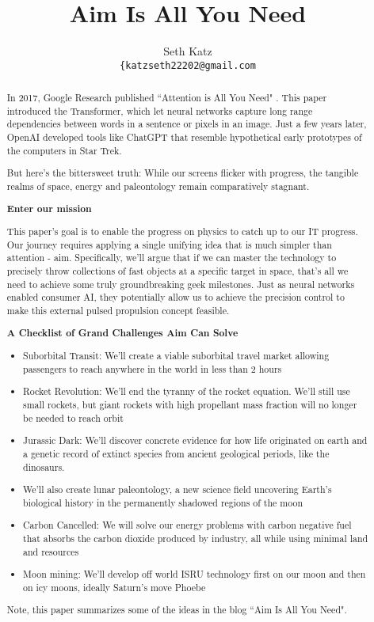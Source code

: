 \documentclass{article}
\title{Aim Is All You Need}
\author{
  Seth Katz \\
  \texttt{\{katzseth22202@gmail.com} \\
}
\begin{document}
\maketitle

\begin{abstract}\label{sec:abstract}
 In 2017, Google Research published ``Attention is All You Need" \cite{vaswani2023attentionneed}.  This paper introduced the Transformer, which let neural networks capture long range dependencies between words in a sentence or pixels in an image.   Just a few years later, OpenAI developed tools like ChatGPT that resemble hypothetical early prototypes of the computers in Star Trek.

But here's the bittersweet truth:  While our screens flicker with progress, the tangible realms of space, energy and paleontology remain comparatively stagnant.

\textbf{Enter our mission}

This paper's goal is to enable the progress on physics to catch up to our IT progress.  Our journey requires applying a single unifying idea that is much simpler than attention - aim.   Specifically, we'll argue that if we can master the technology to precisely throw collections of fast objects at a specific target in space, that's all we need to achieve some truly groundbreaking geek milestones.   Just as neural networks enabled consumer AI, they potentially allow us to achieve the precision control to make this external pulsed propulsion concept feasible.

\textbf{A Checklist of Grand Challenges Aim Can Solve}
\begin{itemize}
    \item 
Suborbital Transit:  We'll create a viable suborbital travel market allowing passengers to reach anywhere in the world in less than 2 hours
 \item Rocket Revolution: We'll end the tyranny of the rocket equation.   We'll still use small rockets, but giant rockets with high propellant mass fraction will no longer be needed to reach orbit
  \item Jurassic Dark: We'll discover concrete evidence for how life originated on earth and a genetic record of extinct species from ancient geological periods, like the dinosaurs. \item We'll also create lunar paleontology, a new science field uncovering Earth's biological history in the permanently shadowed regions of the moon
  \item Carbon Cancelled: We will solve our energy problems with carbon negative fuel that absorbs the carbon dioxide produced by industry, all while using minimal land and resources
  \item Moon mining:  We'll develop off world ISRU technology first on our moon and then on icy moons, ideally Saturn's move Phoebe
\end{itemize}
Note, this paper summarizes some of the ideas in the blog ``Aim Is All You Need"\cite{aim2024}.
\end{abstract}
\end{document}
